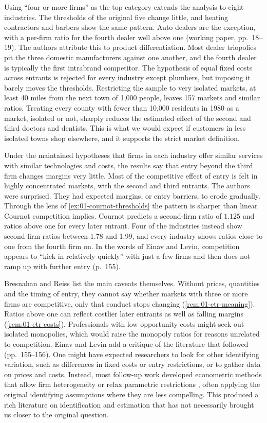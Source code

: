 Using ``four or more firms'' as the top category extends the analysis to eight industries. The thresholds of
the original five change little, and heating contractors and barbers show the same pattern. Auto dealers are
the exception, with a per-firm ratio for the fourth dealer well above one (working paper, pp.~18--19). The authors attribute this to product differentiation. Most dealer triopolies pit the three
domestic manufacturers against one another, and the fourth dealer is typically the first intrabrand
competitor. The hypothesis of equal fixed costs across entrants is rejected for every industry except
plumbers, but imposing it barely moves the thresholds. Restricting the sample to very isolated markets, at least 40 miles
from the next town of 1,000 people, leaves 157 markets and similar ratios.
Treating every county with fewer than 10,000 residents in 1980 as a market, isolated or not, sharply reduces
the estimated effect of the second and third doctors and dentists. This is what we would expect if customers
in less isolated towns shop elsewhere, and it supports the strict market definition.

Under the maintained hypotheses that firms in each industry offer similar services with similar technologies
and costs, the results say that entry beyond the third firm changes margins very little. Most of the
competitive effect of entry is felt in highly concentrated markets, with the second and third entrants. The
authors were surprised. They had expected margins, or entry barriers, to erode gradually. Through the lens of
\cref{ex:01-cournot-thresholds} the pattern is sharper than linear Cournot competition implies. Cournot
predicts a second-firm ratio of $1.125$ and ratios above one for every later entrant. Four of the industries
instead show second-firm ratios between 1.78 and 1.99, and every industry shows ratios close to one from the
fourth firm on. In the words of Einav and Levin, competition
appears to ``kick in relatively quickly'' with just a few firms and then does not ramp up with further entry
(p.~155).

Bresnahan and Reiss list the main caveats themselves. Without prices, quantities and the timing of entry, they
cannot say whether markets with three or more firms are competitive, only that conduct stops changing
(\cref{rem:01-etr-meaning}). Ratios above one can reflect costlier later entrants as well as falling margins
(\cref{rem:01-etr-costs}). Professionals with low opportunity costs might seek out isolated monopolies, which
would raise the monopoly ratios for reasons unrelated to competition. Einav and Levin add a critique of the
literature that followed (pp.~155--156). One might have expected researchers to look for other identifying
variation, such as differences in fixed costs or entry restrictions, or to gather data on prices and costs.
Instead, most follow-up work developed econometric methods that allow firm heterogeneity or relax parametric
restrictions \citep{Berry1992,BerryTamer2006}, often applying the original identifying assumptions where they
are less compelling. This produced a rich literature on identification and estimation that has not
necessarily brought us closer to the original question.

